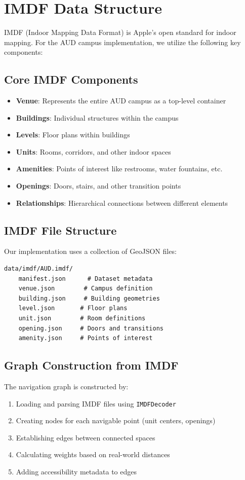 \documentclass{article}
\begin{document}
\section{IMDF Data Structure}
IMDF (Indoor Mapping Data Format) is Apple's open standard for indoor mapping. For the AUD campus implementation, we utilize the following key components:

\subsection{Core IMDF Components}
\begin{itemize}
    \item \textbf{Venue}: Represents the entire AUD campus as a top-level container
    \item \textbf{Buildings}: Individual structures within the campus
    \item \textbf{Levels}: Floor plans within buildings
    \item \textbf{Units}: Rooms, corridors, and other indoor spaces
    \item \textbf{Amenities}: Points of interest like restrooms, water fountains, etc.
    \item \textbf{Openings}: Doors, stairs, and other transition points
    \item \textbf{Relationships}: Hierarchical connections between different elements
\end{itemize}

\subsection{IMDF File Structure}
Our implementation uses a collection of GeoJSON files:
\begin{verbatim}
data/imdf/AUD.imdf/
    manifest.json      # Dataset metadata
    venue.json        # Campus definition
    building.json     # Building geometries
    level.json       # Floor plans
    unit.json        # Room definitions
    opening.json     # Doors and transitions
    amenity.json     # Points of interest
\end{verbatim}

\subsection{Graph Construction from IMDF}
The navigation graph is constructed by:
\begin{enumerate}
    \item Loading and parsing IMDF files using \texttt{IMDFDecoder}
    \item Creating nodes for each navigable point (unit centers, openings)
    \item Establishing edges between connected spaces
    \item Calculating weights based on real-world distances
    \item Adding accessibility metadata to edges
\end{enumerate}
\end{document}
